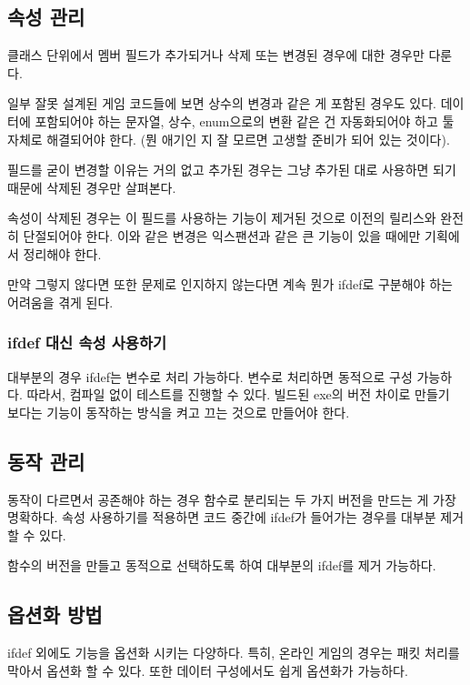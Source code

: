 \documentclass[chapter,kosection, 10.5pt, romanfixed, a4paper]{oblivoir}
\begin{document}
\subsection{속성 관리}

클래스 단위에서 멤버 필드가 추가되거나 삭제 또는 변경된 경우에 대한 경우만 다룬다. 

일부 잘못 설계된 게임 코드들에 보면 상수의 변경과 같은 게 포함된 경우도 있다. 
데이터에 포함되어야 하는 문자열, 상수, enum으로의 변환 같은 건 자동화되어야 하고 
툴 자체로 해결되어야 한다. (뭔 애기인 지 잘 모르면 고생할 준비가 되어 있는 것이다). 

필드를 굳이 변경할 이유는 거의 없고 추가된 경우는 그냥 추가된 대로 사용하면 되기 때문에
삭제된 경우만 살펴본다. 

속성이 삭제된 경우는 이 필드를 사용하는 기능이 제거된 것으로 이전의 릴리스와 완전히 단절되어야 한다. 
이와 같은 변경은 익스팬션과 같은 큰 기능이 있을 때에만 기획에서 정리해야 한다. 

만약 그렇지 않다면 또한 문제로 인지하지 않는다면 계속 뭔가 ifdef로 구분해야 하는 
어려움을 겪게 된다. 

\subsubsection{ifdef 대신 속성 사용하기}

대부분의 경우 ifdef는 변수로 처리 가능하다. 변수로 처리하면 동적으로 구성 가능하다. 따라서, 
컴파일 없이 테스트를 진행할 수 있다. 빌드된 exe의 버전 차이로 만들기 보다는 기능이 동작하는
방식을 켜고 끄는 것으로 만들어야 한다. 

\subsection{동작 관리}

동작이 다르면서 공존해야 하는 경우 함수로 분리되는 두 가지 버전을 만드는 게 가장 명확하다. 
속성 사용하기를 적용하면 코드 중간에 ifdef가 들어가는 경우를 대부분 제거할 수 있다. 

함수의 버전을 만들고 동적으로 선택하도록 하여 대부분의 ifdef를 제거 가능하다. 

\subsection{옵션화 방법}

ifdef 외에도 기능을 옵션화 시키는 다양하다. 특히, 온라인 게임의 경우는 패킷 처리를 
막아서 옵션화 할 수 있다. 또한 데이터 구성에서도 쉽게 옵션화가 가능하다. 
\end{document}
